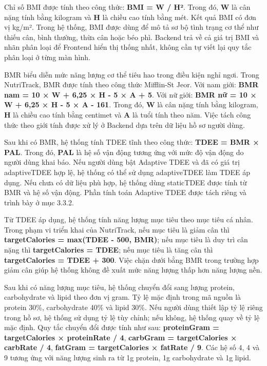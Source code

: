 Chỉ số BMI được tính theo công thức: \textbf{BMI = W / H²}. Trong đó, \textbf{W} là cân nặng tính bằng kilogram và \textbf{H} là chiều cao tính bằng mét. Kết quả BMI có đơn vị kg/m². Trong hệ thống, BMI được dùng để mô tả sơ bộ tình trạng cơ thể như thiếu cân, bình thường, thừa cân hoặc béo phì. Backend trả về cả giá trị BMI và nhãn phân loại để Frontend hiển thị thống nhất, không cần tự viết lại quy tắc phân loại ở từng màn hình.

BMR biểu diễn mức năng lượng cơ thể tiêu hao trong điều kiện nghỉ ngơi. Trong NutriTrack, BMR được tính theo công thức Mifflin-St Jeor. Với nam giới: \textbf{BMR nam = 10 × W + 6,25 × H - 5 × A + 5}. Với nữ giới: \textbf{BMR nữ = 10 × W + 6,25 × H - 5 × A - 161}. Trong đó, \textbf{W} là cân nặng tính bằng kilogram, \textbf{H} là chiều cao tính bằng centimet và \textbf{A} là tuổi tính theo năm. Việc tách công thức theo giới tính được xử lý ở Backend dựa trên dữ liệu hồ sơ người dùng.

Sau khi có BMR, hệ thống tính TDEE tĩnh theo công thức: \textbf{TDEE = BMR × PAL}. Trong đó, \textbf{PAL} là hệ số vận động tương ứng với mức độ vận động do người dùng khai báo. Nếu người dùng bật Adaptive TDEE và đã có giá trị adaptiveTDEE hợp lệ, hệ thống có thể sử dụng adaptiveTDEE làm TDEE áp dụng. Nếu chưa có dữ liệu phù hợp, hệ thống dùng staticTDEE được tính từ BMR và hệ số vận động. Phần tính toán Adaptive TDEE được tách riêng và trình bày ở mục 3.3.2.

Từ TDEE áp dụng, hệ thống tính năng lượng mục tiêu theo mục tiêu cá nhân. Trong phạm vi triển khai của NutriTrack, nếu mục tiêu là giảm cân thì \textbf{targetCalories = max(TDEE - 500, BMR)}; nếu mục tiêu là duy trì cân nặng thì \textbf{targetCalories = TDEE}; nếu mục tiêu là tăng cân thì \textbf{targetCalories = TDEE + 300}. Việc chặn dưới bằng BMR trong trường hợp giảm cân giúp hệ thống không đề xuất mức năng lượng thấp hơn năng lượng nền.

Sau khi có năng lượng mục tiêu, hệ thống chuyển đổi sang lượng protein, carbohydrate và lipid theo đơn vị gram. Tỷ lệ mặc định trong mã nguồn là protein 30\%, carbohydrate 40\% và lipid 30\%. Nếu người dùng thiết lập tỷ lệ riêng trong hồ sơ, hệ thống sử dụng tỷ lệ tùy chỉnh; nếu không, hệ thống quay về tỷ lệ mặc định. Quy tắc chuyển đổi được tính như sau: \textbf{proteinGram = targetCalories × proteinRate / 4}, \textbf{carbGram = targetCalories × carbRate / 4}, \textbf{fatGram = targetCalories × fatRate / 9}. Các hệ số 4, 4 và 9 tương ứng với năng lượng sinh ra từ 1g protein, 1g carbohydrate và 1g lipid.

